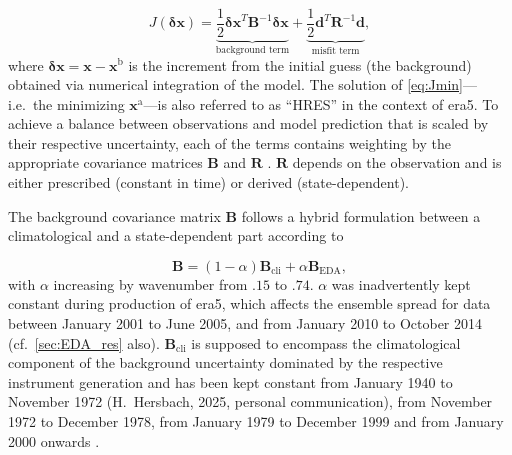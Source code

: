 \begin{equation}\label{eq:Jmin}
    J(\boldsymbol{\delta} \mathbf{x})= \underbrace{\frac{1}{2}{\boldsymbol{\delta} \mathbf{x}}^T \mathbf{B}^{-1}\boldsymbol{\delta} \mathbf{x}}_{\text{background term}}  + \underbrace{\frac{1}{2}\mathbf{d}^T \mathbf{R}^{-1}\mathbf{d}}_{\text{misfit term}},
\end{equation}
where $\boldsymbol{\delta}\mathbf{x} = \mathbf{x} - \mathbf{x}^{\mathrm{b}}$ is the increment from the initial guess (the background) obtained via numerical integration of the model. The solution of \cref{eq:Jmin}---i.e.~the minimizing $\mathbf{x}^{\mathrm{a}}$---is also referred to as \enquote{HRES} in the context of \gls{era5}. To achieve a balance between observations and model prediction that is scaled by their respective uncertainty, each of the terms contains weighting by the appropriate covariance matrices $\mathbf{B}$ and $\mathbf{R}$ \parencite{courtierStrategyOperationalImplementation1994}. $\mathbf{R}$ depends on the observation and is either prescribed (constant in time) or derived (state-dependent).

The background covariance matrix $\mathbf{B}$ follows a hybrid formulation \parencite{isaksenEnsembleDataAssimilations2010, bonavitaEvolutionECMWFHybrid2016} between a climatological and a state-dependent part according to

\begin{equation}
    \mathbf{B} = (1-\alpha)\mathbf{B}_{\text{cli}} + \alpha \mathbf{B}_{\text{EDA}},
\end{equation}
with $\alpha$ increasing by wavenumber from $.15$ to $.74$. $\alpha$ was inadvertently kept constant during production of \gls{era5}, which affects the ensemble spread for data between January 2001 to June 2005, and from January 2010 to October 2014 (cf.~\cref{sec:EDA_res} also). $\mathbf{B}_{\text{cli}}$ is supposed to encompass the climatological component of the background uncertainty dominated by the respective instrument generation and has been kept constant from January 1940 to November 1972 (H.~Hersbach, 2025, personal communication), from November 1972 to December 1978, from January 1979 to December 1999 and from January 2000 onwards \parencite{bellERA5GlobalReanalysis2021}.

